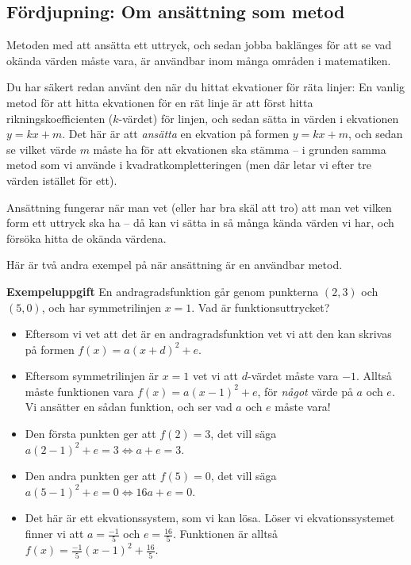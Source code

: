 \subsection{Fördjupning: Om ansättning som metod}

Metoden med att ansätta ett uttryck, och sedan jobba baklänges för att se vad okända värden måste vara, är användbar inom många områden i matematiken.

Du har säkert redan använt den när du hittat ekvationer för räta linjer:
En vanlig metod för att hitta ekvationen för en rät linje är att först hitta rikningskoefficienten ($k$-värdet) för linjen, och sedan sätta in värden i ekvationen $y=kx+m$.
Det här är att \emph{ansätta} en ekvation på formen $y=kx+m$, och sedan se vilket värde $m$ måste ha för att ekvationen ska stämma -- i grunden samma metod som vi använde i kvadratkompletteringen (men där letar vi efter tre värden istället för ett).

Ansättning fungerar när man vet (eller har bra skäl att tro) att man vet vilken form ett uttryck ska ha -- då kan vi sätta in så många kända värden vi har, och försöka hitta de okända värdena.

Här är två andra exempel på när ansättning är en användbar metod.

\smallskip

\textbf{Exempeluppgift}
En andragradsfunktion går genom punkterna $(2, 3)$ och $(5, 0)$, och har symmetrilinjen $x=1$. Vad är funktionsuttrycket?

\begin{itemize}
  \item Eftersom vi vet att det är en andragradsfunktion vet vi att den kan skrivas på formen $f(x)=a(x+d)^2+e$.
  \item Eftersom symmetrilinjen är $x=1$ vet vi att $d$-värdet måste vara $-1$.
  Alltså måste funktionen vara $f(x)=a(x-1)^2+e$, för \emph{något} värde på $a$ och $e$.
  Vi ansätter en sådan funktion, och ser vad $a$ och $e$ måste vara!
  \item Den första punkten ger att $f(2)=3$, det vill säga $a(2-1)^2+e=3 \Leftrightarrow a+e=3$.
  \item Den andra punkten ger att $f(5)=0$, det vill säga $a(5-1)^2+e=0 \Leftrightarrow 16a+e=0$.
  \item Det här är ett ekvationssystem, som vi kan lösa.
  Löser vi ekvationssystemet finner vi att $a=\frac{-1}{5}$ och $e=\frac{16}{5}$.
  Funktionen är alltså $f(x)=\frac{-1}{5}(x-1)^2 + \frac{16}{5}$.
\end{itemize}

